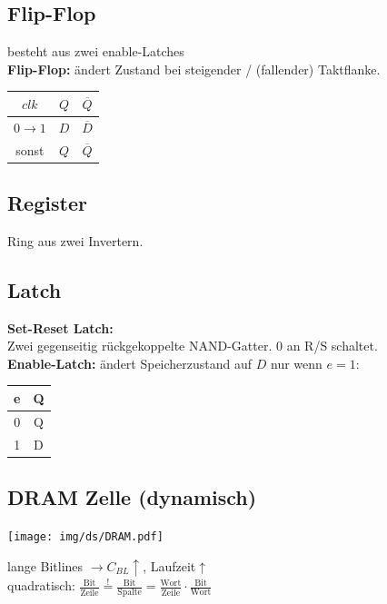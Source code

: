\documentclass[6pt,a4paper]{scrartcl}
\renewcommand{\emph}[1]{\textsf{\textbf{#1}}}
\newcommand{\ol}[1]{\ensuremath{\overline{#1}}}									%
\newcommand{\ra}[0]{\ensuremath{\rightarrow}} 									%
\begin{document}
\begin{multicols}{3}

	\subsection{Flip-Flop}
	\begin{multicols}{2}
	besteht aus zwei enable-Latches \\
	\emph{Flip-Flop:} ändert Zustand bei steigender / (fallender) Taktflanke.\\
	\begin{tabular}{c|c|c} $clk$ & $Q$ & $\ol Q$ \\ \hline $0 \ra 1$ & $D$ & $\ol D$ \\ sonst & $Q$ & $\ol Q$ \end{tabular}
	\end{multicols}
	\subsection{Register}
	Ring aus zwei Invertern.

	\subsection{Latch}
	\begin{multicols}{2}
	\emph{Set-Reset Latch:} \\ Zwei gegenseitig rückgekoppelte NAND-Gatter. $0$ an R/S schaltet. \\
	\emph{Enable-Latch:} ändert Speicherzustand auf $D$ nur wenn $e=1$: \begin{tabular}{c|c} e & Q \\ \hline 0 & Q \\ 1 & D \end{tabular}
	\end{multicols}
	\subsection{DRAM Zelle (dynamisch)}

	\parbox{3.0cm}{ \texttt{[image: img/ds/DRAM.pdf]} }
	\parbox{6.0cm}{ 
	
	lange Bitlines $\ra C_{BL} \uparrow$, Laufzeit$\uparrow$\\
	quadratisch: $\frac{\text{Bit}}{\text{Zeile}} \stackrel{!}= \frac{\text{Bit}}{\text{Spalte}} = \frac{\text{Wort}}{\text{Zeile}} \cdot \frac{\text{Bit}}{\text{Wort}}$\\
	
}
\end{multicols}
\end{document}

